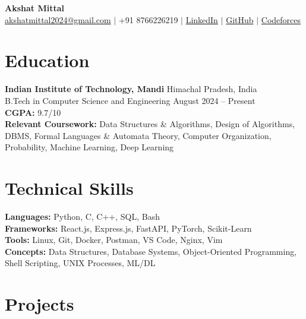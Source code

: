 \documentclass[a4paper,10pt]{article}
\begin{document}
\noindent
{\LARGE \textbf{Akshat Mittal}}\\[4pt]
\noindent
\href{mailto:akshatmittal2024@gmail.com}{akshatmittal2024@gmail.com} \hspace{2pt} $|$ \hspace{2pt}
+91 8766226219 \hspace{2pt} $|$ \hspace{2pt}
\href{http://www.linkedin.com/in/akshat-mittal-511477313}{LinkedIn} \hspace{2pt} $|$ \hspace{2pt}
\href{https://github.com/akshatidk29/}{GitHub} \hspace{2pt} $|$ \hspace{2pt}
\href{https://codeforces.com/profile/akshat_idk_29}{Codeforces}
\vspace{4pt}

\vspace{3pt}
\section*{Education}
\vspace{3pt}
\textbf{Indian Institute of Technology, Mandi} \hfill Himachal Pradesh, India\\
B.Tech in Computer Science and Engineering \hfill August 2024 -- Present\\
\textbf{CGPA:} 9.7/10 \\
\textbf{Relevant Coursework:} Data Structures \& Algorithms, Design of Algorithms, DBMS, Formal Languages \& Automata Theory, Computer Organization, Probability, Machine Learning, Deep Learning

\vspace{3pt}
\section*{Technical Skills}
\vspace{3pt}
\textbf{Languages:} Python, C, C++, SQL, Bash\\
\textbf{Frameworks:} React.js, Express.js, FastAPI, PyTorch, Scikit-Learn\\
\textbf{Tools:} Linux, Git, Docker, Postman, VS Code, Nginx, Vim\\
\textbf{Concepts:} Data Structures, Database Systems, Object-Oriented Programming, Shell Scripting, UNIX Processes, ML/DL

\vspace{3pt}
\section*{Projects}
\vspace{3pt}
\end{document}
